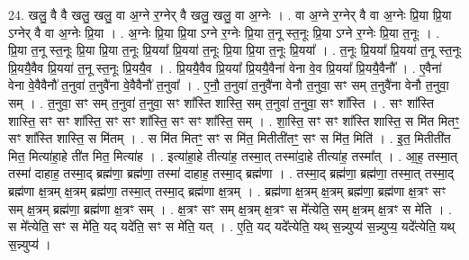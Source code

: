 \documentclass[17pt]{extarticle}
\begin{document}
24. खलु॒ वै वै खलु॒ खलु॒ वा अ॒ग्ने र॒ग्नेर् वै खलु॒ खलु॒ वा अ॒ग्नेः । . वा अ॒ग्ने र॒ग्नेर् वै वा अ॒ग्नेः प्रि॒या प्रि॒या ऽग्नेर् वै वा अ॒ग्नेः प्रि॒या । . अ॒ग्नेः प्रि॒या प्रि॒या ऽग्ने र॒ग्नेः प्रि॒या त॒नू स्त॒नूः प्रि॒या ऽग्ने र॒ग्नेः प्रि॒या त॒नूः । . प्रि॒या त॒नू स्त॒नूः प्रि॒या प्रि॒या त॒नूः प्रि॒यया᳚ प्रि॒यया॑ त॒नूः प्रि॒या प्रि॒या त॒नूः प्रि॒यया᳚ । . त॒नूः प्रि॒यया᳚ प्रि॒यया॑ त॒नू स्त॒नूः प्रि॒ययै॒वैव प्रि॒यया॑ त॒नू स्त॒नूः प्रि॒ययै॒व । . प्रि॒ययै॒वैव प्रि॒यया᳚ प्रि॒ययै॒वैना॑ वेना वे॒व प्रि॒यया᳚ प्रि॒ययै॒वैनौ᳚ । . ए॒वैना॑ वेना वे॒वैवैनौ॑ त॒नुवा॑ त॒नुवै॑ना वे॒वैवैनौ॑ त॒नुवा᳚ । . ए॒नौ॒ त॒नुवा॑ त॒नुवै॑ना वेनौ त॒नुवा॒ सꣳ सम् त॒नुवै॑ना वेनौ त॒नुवा॒ सम् । . त॒नुवा॒ सꣳ सम् त॒नुवा॑ त॒नुवा॒ सꣳ शा᳚स्ति शास्ति॒ सम् त॒नुवा॑ त॒नुवा॒ सꣳ शा᳚स्ति । . सꣳ शा᳚स्ति शास्ति॒ सꣳ सꣳ शा᳚स्ति॒ सꣳ सꣳ शा᳚स्ति॒ सꣳ सꣳ शा᳚स्ति॒ सम् । . शा॒स्ति॒ सꣳ सꣳ शा᳚स्ति शास्ति॒ स मि॑त मितꣳ॒॒ सꣳ शा᳚स्ति शास्ति॒ स मि॑तम् । . स मि॑त मितꣳ॒॒ सꣳ स मि॑त॒ मितीती॑तꣳ॒॒ सꣳ स मि॑त॒ मिति॑ । . इ॒त॒ मितीती॑त मित॒ मित्या॑हा॒हे ती॑त मित॒ मित्या॑ह । . इत्या॑हा॒हे तीत्या॑ह॒ तस्मा॒त् तस्मा॑दा॒हे तीत्या॑ह॒ तस्मा᳚त् । . आ॒ह॒ तस्मा॒त् तस्मा॑ दाहाह॒ तस्मा॒द् ब्रह्म॑णा॒ ब्रह्म॑णा॒ तस्मा॑ दाहाह॒ तस्मा॒द् ब्रह्म॑णा । . तस्मा॒द् ब्रह्म॑णा॒ ब्रह्म॑णा॒ तस्मा॒त् तस्मा॒द् ब्रह्म॑णा क्ष॒त्रम् क्ष॒त्रम् ब्रह्म॑णा॒ तस्मा॒त् तस्मा॒द् ब्रह्म॑णा क्ष॒त्रम् । . ब्रह्म॑णा क्ष॒त्रम् क्ष॒त्रम् ब्रह्म॑णा॒ ब्रह्म॑णा क्ष॒त्रꣳ सꣳ सम् क्ष॒त्रम् ब्रह्म॑णा॒ ब्रह्म॑णा क्ष॒त्रꣳ सम् । . क्ष॒त्रꣳ सꣳ सम् क्ष॒त्रम् क्ष॒त्रꣳ स मे᳚त्येति॒ सम् क्ष॒त्रम् क्ष॒त्रꣳ स मे॑ति । . स मे᳚त्येति॒ सꣳ स मे॑ति॒ यद् यदे॑ति॒ सꣳ स मे॑ति॒ यत् । . ए॒ति॒ यद् यदे᳚त्येति॒ यथ् स॒न्न्युप्य॑ स॒न्न्युप्य॒ यदे᳚त्येति॒ यथ् स॒न्न्युप्य॑ । \newline
\end{document}
